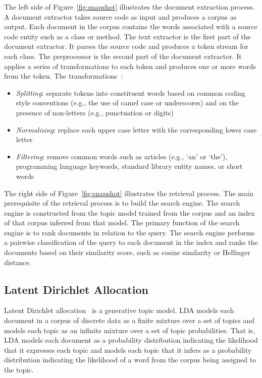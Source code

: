 The left side of Figure~\ref{fig:snapshot} illustrates the document extraction process.
A document extractor takes source code as input and produces a corpus as output.
Each document in the corpus contains the words associated with a source code entity
such as a class or method.
The text extractor is the first part of the document extractor.
It parses the source code and produces a token stream for each class.
The preprocessor is the second part of the document extractor.
It applies a series of transformations to each token and
produces one or more words from the token.
The transformations~\cite{Marcus-etal:2004,Marcus-Menzies:2010}: %
\begin{itemize}
    \item {\it Splitting}: separate tokens into constituent words
        based on common coding style conventions (e.g., the use of camel case or underscores)
        and on the presence of non-letters (e.g., punctuation or digits)
    \item {\it Normalizing}: replace each upper case letter with the corresponding lower case letter
    \item {\it Filtering}: remove common words such as articles (e.g., `an' or `the'),
        programming language keywords, standard library entity names, or short words
\end{itemize}

The right side of Figure~\ref{fig:snapshot} illustrates the retrieval process.
The main prerequisite of the retrieval process is to build the search engine.
The search engine is constructed from the topic model trained from the corpus
and an index of that corpus inferred from that model.
The primary function of the search engine is to rank documents in relation to the query.
The search engine performs a pairwise classification of the query to each
document in the index and ranks the documents based on their similarity score,
such as cosine similarity or Hellinger distance.

\subsection{Latent Dirichlet Allocation}

Latent Dirichlet allocation~\cite{Blei-etal:2003} is a generative topic model.
LDA models each document in a corpus of discrete data as a finite mixture over
a set of topics and models each topic as an infinite mixture over a set of
topic probabilities.  That is, LDA models each document as a probability
distribution indicating the likelihood that it expresses each topic and models
each topic that it infers as a probability distribution indicating the
likelihood of a word from the corpus being assigned to the topic.

